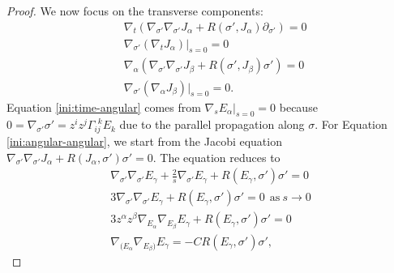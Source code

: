\documentclass[pdflatex,sn-mathphys-num]{sn-jnl}
\theoremstyle{definition}
\begin{document}
\begin{proof}
We now focus on the transverse components:
\begin{align}
    &\nabla_{t}(\nabla_{\sigma'}\nabla_{\sigma'}J_{\alpha} + R(\sigma',J_{\alpha})\partial_{\sigma'}) = 0\label{eqn:time-angular}\\
    &\nabla_{\sigma'}(\nabla_{t}J_{\alpha})|_{s = 0} = 0\label{ini:time-angular}\\
    &\nabla_{\alpha}(\nabla_{\sigma'}\nabla_{\sigma'}J_{\beta} + R(\sigma',J_{\beta})\sigma') = 0\label{eqn:angular-angular}\\
    &\nabla_{\sigma'}(\nabla_{\alpha}J_{\beta})|_{s = 0} = 0.\label{ini:angular-angular}
\end{align}
Equation \ref{ini:time-angular} comes from $\nabla_{s}E_{\alpha}|_{s=0} = 0$ because $0 = \nabla_{\sigma'}\sigma' = z^iz^j\Gamma_{i j}^{~~k}E_k$ due to the parallel propagation along $\sigma$. For Equation \ref{ini:angular-angular}, we start from the Jacobi equation $\nabla_{\sigma'}\nabla_{\sigma'}J_{\alpha} + R(J_{\alpha},\sigma')\sigma' = 0$. The equation reduces to
\begin{align*}
    \nabla_{\sigma'}\nabla_{\sigma'}E_{\gamma} + \frac{2}{s}\nabla_{\sigma'}E_{\gamma} + R(E_{\gamma},\sigma')\sigma' = 0\\
    3\nabla_{\sigma'}\nabla_{\sigma'}E_{\gamma} + R(E_{\gamma},\sigma')\sigma' = 0~~\text{as}~s \rightarrow 0\\
    3z^{\alpha}z^{\beta}\nabla_{E_{\alpha}}\nabla_{E_{\beta}}E_{\gamma} + R(E_{\gamma},\sigma')\sigma' = 0\\
    \nabla_{(E_{\alpha}}\nabla_{E_{\beta})}E_{\gamma} = - C R(E_{\gamma},\sigma')\sigma',
\end{align*}

\end{proof}
\end{document}
